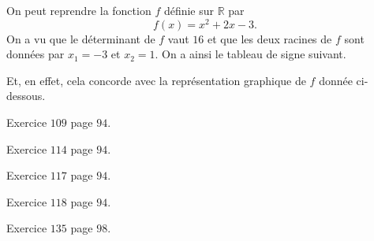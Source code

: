 \documentclass[11pt]{article}
\begin{document}
\begin{exemple}
  On peut reprendre la fonction $f$ définie sur $\mathbb{R}$ par
  \[
    f(x) = x^2+2x-3.
  \]
  On a vu que le déterminant de $f$ vaut $16$ et que les deux racines de $f$
  sont données par $x_1=-3$ et $x_2=1$. On a ainsi le tableau de signe suivant.
  \begin{center}
  \end{center}
  Et, en effet, cela concorde avec la représentation graphique de $f$ donnée
  ci-dessous.
  \begin{center}
  \end{center}
\end{exemple}

\begin{exo}
  Exercice $109$ page $94$.
\end{exo}
\begin{exo}
  Exercice $114$ page $94$.
\end{exo}
\begin{exo}
  Exercice $117$ page $94$.
\end{exo}
\begin{exo}
  Exercice $118$ page $94$.
\end{exo}
\begin{exo}
  Exercice $135$ page $98$.
\end{exo}
\end{document}
